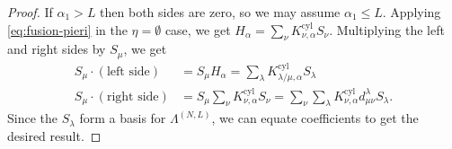 \documentclass[10pt,a4paper]{amsart}
\newcommand{\cyl}{\mathrm{cyl}}
\begin{document}
\begin{proof}
If $\alpha_1 > L$ then both sides are zero, so we may assume $\alpha_1 \leq L$.
Applying \eqref{eq:fusion-pieri} in the $\eta=\emptyset$ case, we get $H_{\alpha} = \sum_{\nu} K^\cyl_{\nu,\alpha} S_{\nu}$. Multiplying the left and right sides by $S_{\mu}$, we get
\begin{align*}
S_\mu \cdot (\text{left side}) &= S_{\mu} H_{\alpha} = \sum_{\lambda} K^\cyl_{\lambda/\mu,\alpha} S_{\lambda} \\
S_\mu \cdot (\text{right side}) &= S_{\mu} \sum_{\nu} K^\cyl_{\nu,\alpha} S_{\nu} = \sum_{\nu} \sum_{\lambda}  K^\cyl_{\nu,\alpha} d^\lambda_{\mu\nu} S_{\lambda}.
\end{align*}
Since the $S_{\lambda}$ form a basis for $\Lambda^{(N,L)}$, we can equate coefficients to get the desired result.
\end{proof}
\end{document}
